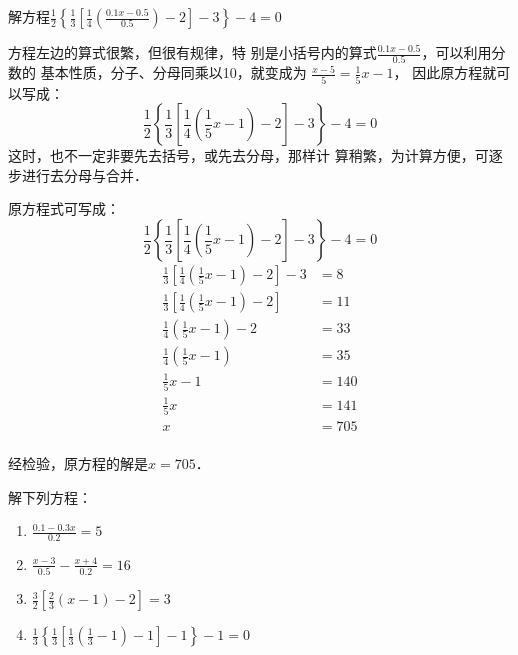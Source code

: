 \begin{example}
    解方程$\frac{1}{2}\left\{\frac{1}{3}\left[\frac{1}{4}\left(\frac{0.1x-0.5}{0.5}\right)-2\right]-3\right\}-4=0$
\end{example}

\begin{analyze}
方程左边的算式很繁，但很有规律，特
    别是小括号内的算式$\frac{0.1x-0.5}{0.5}$，可以利用分数的
    基本性质，分子、分母同乘以10，就变成为
$\frac{x-5}{5}=\frac{1}{5}x-1$，
    因此原方程就可以写成：
   \[\frac{1}{2}\left\{\frac{1}{3}\left[\frac{1}{4}\left(\frac{1}{5}x-1\right)-2\right]-3\right\}-4=0 \]
    这时，也不一定非要先去括号，或先去分母，那样计
    算稍繁，为计算方便，可逐步进行去分母与合并．
\end{analyze}

\begin{solution}
    原方程式可写成：\[\frac{1}{2}\left\{\frac{1}{3}\left[\frac{1}{4}\left(\frac{1}{5}x-1\right)-2\right]-3\right\}-4=0 \]
\begin{align*}
    \frac{1}{3}\left[\frac{1}{4}\left(\frac{1}{5}x-1\right)-2\right]-3 &=8  \tag{两边乘以2}\\
    \frac{1}{3}\left[\frac{1}{4}\left(\frac{1}{5}x-1\right)-2\right]&=11   \tag{移项、合并}\\
    \frac{1}{4}\left(\frac{1}{5}x-1\right)-2&=33  \tag{两边乘以3}\\
    \frac{1}{4}\left(\frac{1}{5}x-1\right)&=35   \tag{移项、合并}\\
    \frac{1}{5}x-1&=140 \tag{两边乘以4}\\
    \frac{1}{5}x&=141  \tag{移项、合并}\\
    x&=705  \tag{两边乘以5}\\
\end{align*}   

经检验，原方程的解是$x=705$．
\end{solution}

\begin{ex}
解下列方程：
\begin{enumerate}
    \item \quad$\frac{0.1-0.3x}{0.2}=5$
    \item \quad$\frac{x-3}{0.5}-\frac{x+4}{0.2}=16$
    \item \quad$\frac{3}{2}\left[\frac{2}{3}(x-1)-2\right]=3$
    \item \quad$\frac{1}{3}\left\{\frac{1}{3}\left[\frac{1}{3}\left(\frac{1}{3}-1\right)-1\right]-1\right\}-1=0$
\end{enumerate}
\end{ex}

